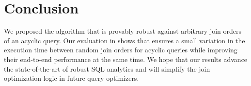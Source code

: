 \section{Conclusion}
\label{Conclusion}

We proposed the \RPT algorithm that is provably robust against arbitrary join orders of an acyclic query. Our evaluation in \duckdb shows that \rpt ensures a small variation in the execution time between random join orders for acyclic queries while improving their end-to-end performance at the same time. We hope that our results advance the state-of-the-art of robust SQL analytics and will simplify the join optimization logic in future query optimizers.